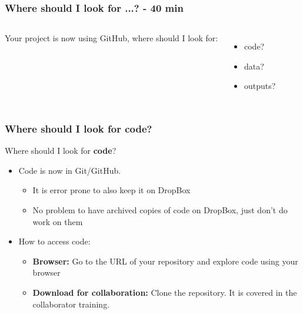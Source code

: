 \documentclass[aspectratio=169]{beamer} %
\begin{document}
\begin{frame}
	\frametitle{Where should I look for ...? - 40 min}
	
	\begin{columns}[c] 
	
		
		\Large Your project is now using GitHub, where should I look for:
		
		\vspace{0.5cm}
		
		\begin{itemize}
			\item code?		
			\item data? 
			\item outputs?		
		\end{itemize}
		
		
	\end{columns}	
\end{frame}

\begin{frame}
	\frametitle{Where should I look for code?}
	
	Where should I look for \textbf{code}?
	
	\begin{itemize}
		\item Code is now in Git/GitHub. 
		\begin{itemize}
			\item It is error prone to also keep it on DropBox
			\item No problem to have archived copies of code on DropBox, just don't do work on them
		\end{itemize}
		\item How to access code:
		\begin{itemize}
			\item \textbf{Browser:} Go to the URL of your repository and explore code using your browser
			\item \textbf{Download for collaboration:} Clone the repository. It is covered in the collaborator training.
		\end{itemize}		
	\end{itemize}
\end{frame}
\end{document}

